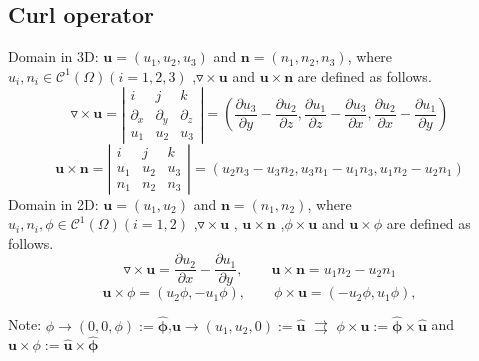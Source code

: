 \documentclass[a4paper,11pt]{article}
\begin{document}
\subsection{Curl operator}
Domain in 3D: $\mathbf{u}=(u_1,u_2,u_3)$ and $\mathbf{n} = (n_1,n_2,n_3)$, where $u_i,n_i\in\mathcal{C}^1(\Omega) (i=1,2,3)$
,$\triangledown\times\mathbf{u}$ and $\mathbf{u}\times\mathbf{n}$ are defined as follows.
\begin{displaymath}
\triangledown\times\mathbf{u} =
\left| \begin{array}{ccc}
      i & j & k \\
      \partial_x & \partial_y & \partial_z \\
       u_1 & u_2 & u_3
\end{array} \right| =
(\frac{\partial u_3}{\partial y} - \frac{\partial u_2}{\partial z},
 \frac{\partial u_1}{\partial z} - \frac{\partial u_3}{\partial x},
 \frac{\partial u_2}{\partial x} - \frac{\partial u_1}{\partial y})
\end{displaymath}
\begin{displaymath}
\mathbf{u}\times\mathbf{n} =
\left| \begin{array}{ccc}
      i & j & k \\
      u_1 & u_2 & u_3 \\
      n_1 & n_2 & n_3
\end{array} \right| = ( u_{2}n_{3} - u_{3}n_{2},u_{3}n_{1} - u_{1}n_{3},u_{1}n_{2} - u_{2}n_{1})
\end{displaymath}
Domain in 2D: $\mathbf{u}=(u_1,u_2)$ and $\mathbf{n} = (n_1,n_2)$, where $u_i,n_i,\phi\in\mathcal{C}^1(\Omega) (i=1,2)$
,$\triangledown\times\mathbf{u}$ , $\mathbf{u}\times\mathbf{n}$ ,$\phi\times\mathbf{u}$ and $\mathbf{u}\times\phi$ are defined as follows.
\begin{displaymath}
\triangledown\times\mathbf{u} = \frac{\partial u_2}{\partial x} - \frac{\partial u_1}{\partial y},\qquad \mathbf{u}\times\mathbf{n} = u_{1}n_{2} - u_{2}n_{1}
\end{displaymath}
\begin{displaymath}
\mathbf{u}\times\phi = (u_{2}\phi ,-u_{1}\phi),\qquad \phi\times\mathbf{u} = (-u_{2}\phi ,u_{1}\phi),
\end{displaymath}

Note: $\phi\rightarrow (0,0,\phi) := \widehat{\mathbf{\phi}}$,$\mathbf{u}\rightarrow (u_1,u_2,0) := \widehat{\mathbf{u}}$\newline
\indent\indent\indent$\rightrightarrows$ $\phi\times\mathbf{u} := \widehat{\mathbf{\phi}}\times\widehat{\mathbf{u}}$ and $\mathbf{u}\times\phi := \widehat{\mathbf{u}}\times\widehat{\mathbf{\phi}}$
\end{document}
